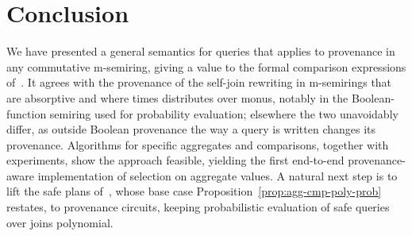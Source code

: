\section{Conclusion}
\label{sec:conclusion}

We have presented a general semantics for  queries that
applies to provenance in any commutative m-semiring, giving a value to
the formal comparison expressions of~\cite{amsterdamer2011provenance}. It agrees with the provenance of the self-join
rewriting in m-semirings that are absorptive and where times distributes
over monus, notably in the Boolean-function semiring used for
probability evaluation; elsewhere the two unavoidably differ, as outside
Boolean provenance the way a query is written changes its provenance. Algorithms for specific aggregates and comparisons, together with
experiments, show the approach feasible, yielding the first end-to-end
provenance-aware implementation of selection on aggregate values. A natural next step is
to lift the safe plans of~\cite{re2009trichotomy}, whose base case
Proposition~\ref{prop:agg-cmp-poly-prob} restates, to provenance
circuits, keeping probabilistic evaluation of safe 
queries over joins polynomial.
